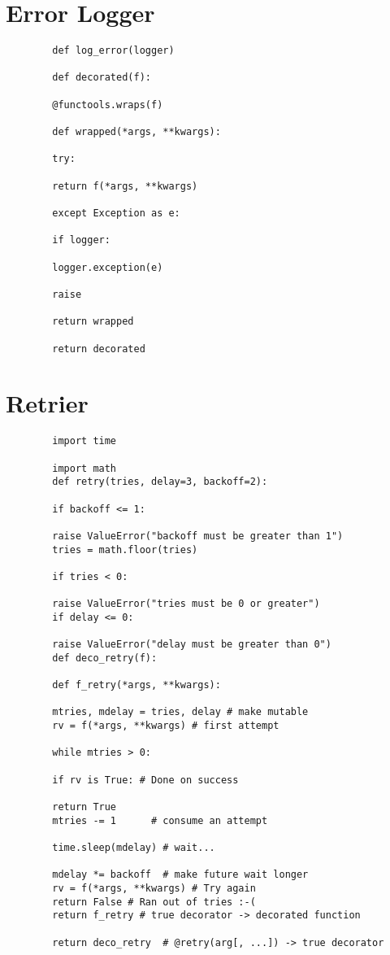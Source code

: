 \documentclass{article}
\begin{document}
	\section {Error Logger}
	\begin{lstlisting}
		def log_error(logger)
		
		def decorated(f):
		
		@functools.wraps(f)
		
		def wrapped(*args, **kwargs):
		
		try:
		
		return f(*args, **kwargs)
		
		except Exception as e:
		
		if logger:
		
		logger.exception(e)
		
		raise
		
		return wrapped
		
		return decorated
	\end{lstlisting}

	\section {Retrier}
	\begin{lstlisting}
		import time
		
		import math
		def retry(tries, delay=3, backoff=2):
	
		if backoff <= 1:
		
		raise ValueError("backoff must be greater than 1")
		tries = math.floor(tries)
		
		if tries < 0:
		
		raise ValueError("tries must be 0 or greater")
		if delay <= 0:
		
		raise ValueError("delay must be greater than 0")
		def deco_retry(f):
		
		def f_retry(*args, **kwargs):
		
		mtries, mdelay = tries, delay # make mutable
		rv = f(*args, **kwargs) # first attempt
		
		while mtries > 0:
		
		if rv is True: # Done on success
		
		return True
		mtries -= 1      # consume an attempt
		
		time.sleep(mdelay) # wait...
		
		mdelay *= backoff  # make future wait longer
		rv = f(*args, **kwargs) # Try again
		return False # Ran out of tries :-(
		return f_retry # true decorator -> decorated function
		
		return deco_retry  # @retry(arg[, ...]) -> true decorator
	\end{lstlisting}
\end{document}
